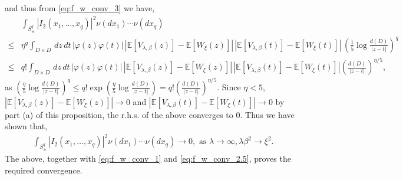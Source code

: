 \documentclass[a4paper, 11pt, reqno]{amsart}
\theoremstyle{definition} \newtheorem{defn}{Definition}[section]
\theoremstyle{remark} \newtheorem{rem}[defn]{Remark}
\theoremstyle{remark} \newtheorem*{rem*}{Remark}
\theoremstyle{plain} \newtheorem{thm}[defn]{Theorem}
\theoremstyle{plain} \newtheorem{lem}[defn]{Lemma}
\theoremstyle{plain} \newtheorem{prop}[defn]{Proposition}
\theoremstyle{plain} \newtheorem{cor}[defn]{Corollary}
\theoremstyle{remark} \newtheorem{exm}[defn]{\textbf{Example}}
\theoremstyle{remark} \newtheorem{exms}[defn]{\textbf{Examples}}
\theoremstyle{remark} \newtheorem*{bl}{}
\numberwithin{equation}{section} %
\newcommand{\x}{\times}
\newcommand{\E}{\mathbb{E}}
\begin{document}
		and thus from \eqref{eq:f_w_conv_3} we have, 
		\begin{align}\label{eq:f_w_conf_3.5}
			& \int_{S_{\pm}^q} |I_2(x_1, \ldots, x_q)|^2 \nu(dx_1)\cdots\nu(dx_q) 
			\nonumber \\
			\le & \eta^q \int_{D\x D} \, dz \, dt \, |\varphi(z) \varphi(t)| \, |\E[V_{\lambda, \beta}(z)] - \E[W_{\xi}(z)]| \, |\E[V_{\lambda, \beta}(t)] - \E[W_{\xi}(t)]| \, \left(\frac{1}{5} \log \frac{d(D)}{|z-t|}\right)^q
			\nonumber \\
			\le & q! \int_{D\x D} \, dz \, dt \, |\varphi(z) \varphi(t)| \, |\E[V_{\lambda, \beta}(z)] - \E[W_{\xi}(z)]| \, |\E[V_{\lambda, \beta}(t)] - \E[W_{\xi}(t)]|  \left( \frac{d(D)}{|z-t|}\right)^{\eta/5},
		\end{align}
		as $(\frac{\eta}{5} \log \frac{d(D)}{|z-t|})^q \le q! \exp( \frac{\eta}{5} \log \frac{d(D)}{|z-t|}) = q!  ( \frac{d(D)}{|z-t|})^{\eta/5}$. Since $\eta< 5$, $|\E[V_{\lambda, \beta}(z)] - \E[W_{\xi}(z)]| \to 0$ and $|\E[V_{\lambda, \beta}(t)] - \E[W_{\xi}(t)]| \to 0$ by part (a) of this proposition, the r.h.s. of the above converges to $0$. Thus we have shown that, 
		\begin{align}
			\int_{S_{\pm}^q} |I_2(x_1, \ldots, x_q)|^2 \nu(dx_1)\cdots\nu(dx_q)  \to 0, \text { as } \lambda \to \infty, \lambda \beta^2 \to \xi^2.
		\end{align}
        The above, together with \eqref{eq:f_w_conv_1} and \eqref{eq:f_w_conv_2.5}, proves the required convergence. 		
		
\end{document}
